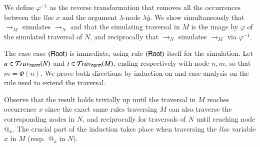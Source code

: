 \documentclass{elsarticle}
\newif\ifshortversion
\theoremstyle{plain}
\theoremstyle{definition}
\newcommand{\normalizing}{{\sf norm}}
\newcommand{\travsetnorm}{\travset_\normalizing} %
\begin{document}
%
We define $\varphi^{-1}$ as the reverse transformation
that removes all the occurrences between the \emph{lloc} $x$ and the  argument $\lambda$-node $\lambda\overline{y}$.
%
%
%
We show simultaneously that $\rightarrow_M$ simulates
$\rightarrow_N$ and that the simulating traversal in $M$ is the image
by $\varphi$ of the simulated traversal of $N$, and reciprocally that
$\rightarrow_N$ simulates $\rightarrow_M$ via $\varphi^{-1}$.
%
\ifshortversion
The proof goes by induction on and case analysis on
the rule used to extend the traversal.
\else
The case case $\mathbf{({\sf Root})}$ is immediate, using rule $\mathbf{({\sf Root})}$ itself for the simulation.
%
Let $u\in \travsetnorm(N)$ and $t\in\travsetnorm(M)$,
ending respectively with node $n, m$, so that $m = \Phi(n)$.
We prove both directions by induction on
and case analysis on the rule used to
extend the traversal.

Observe that the result holds trivially up until the traversal in $M$ reaches occurrence $x$ since the exact same rules traversing $M$
can also traverse the corresponding nodes in $N$, and reciprocally for traversals of $N$ until reaching node $@_x$. The crucial part of the induction takes place when traversing the \emph{lloc} variable $x$ in $M$ (resp.~$@_x$ in $N$).
\fi
\end{document}
